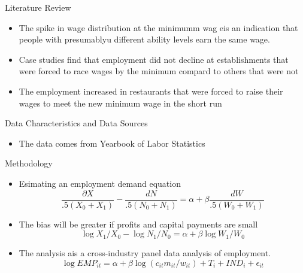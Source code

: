 \documentclass[12pt]{beamer}
\begin{document}
\begin{frame}[allowframebreaks]{Literature Review}
	\begin{itemize}
		\item The spike in wage distribution at the minimumm wag eis an indication that people with presumablyu different ability levels earn the same wage. \cite{brown1988minimum}
		\item Case studies find that employment did not decline at establishments that were forced to race wages by the minimum compard to others that were not \cite{card1993minimum}
		\item The employment increased in restaurants that were forced to raise their wages to meet the new minimum wage in the short run \cite{card1992using}
	\end{itemize}

\end{frame}

\begin{frame}[allowframebreaks]{Data Characteristics and Data Sources}
	\begin{itemize}
		\item The data comes from Yearbook of Labor Statistics
	\end{itemize}
\end{frame}

\begin{frame}[allowframebreaks]{Methodology}
	\begin{itemize}
		\item Esimating an employment demand equation
		      \begin{equation}
			      \frac{\partial X}{.5(X_0 + X_1)} - \frac{d N}{.5(N_0 + N_1)} = \alpha + \beta \frac{d W}{.5(W_0 + W_1)}
		      \end{equation}
		\item The bias will be greater if profits and capital payments are small
		      \begin{equation}
			      \log{X_1/X_0} - \log{N_1/N_0} = \alpha + \beta \log{W_1/W_0}
		      \end{equation}
		\item The analysis ais a cross-industry panel data analysis of employment.
		      \begin{equation}
			      \log{EMP_{it}} = \alpha + \beta \log(c_{it}m_{it}/w_{it}) + T_i + IND_i + \epsilon_{it}
		      \end{equation}
	\end{itemize}

\end{frame}
\end{document}
